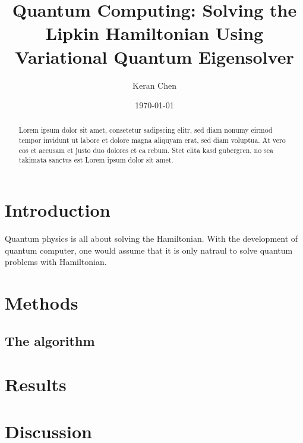 \documentclass[english,notitlepage,reprint,nofootinbib]{revtex4-1}
\begin{document}
\title{Quantum Computing: Solving the Lipkin Hamiltonian Using Variational Quantum Eigensolver}
\author{Keran Chen} %
\date{\today}                             %
\noaffiliation                            %

\begin{abstract}
    
Lorem ipsum dolor sit amet, consetetur sadipscing elitr, sed diam nonumy eirmod tempor invidunt ut labore et dolore magna aliquyam erat, sed diam voluptua. At vero eos et accusam et justo duo dolores et ea rebum. Stet clita kasd gubergren, no sea takimata sanctus est Lorem ipsum dolor sit amet.

\end{abstract}
\maketitle


\section{Introduction}\label{sec:intro}
Quantum physics is all about solving the Hamiltonian. With the development of quantum computer, one would assume that it is only natraul to solve quantum problems with Hamiltonian.


%

\section{Methods}\label{sec:methods}

\subsection*{The algorithm}\label{sec:algo}
%


\section{Results}\label{sec:results}
%
\section{Discussion}\label{sec:discussion}
%
\end{document}
